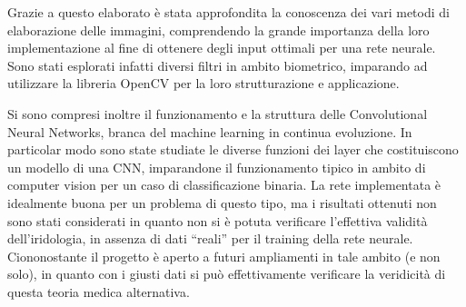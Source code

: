 Grazie a questo elaborato è stata approfondita la conoscenza dei vari metodi di elaborazione delle immagini, comprendendo la grande importanza della loro implementazione al fine di ottenere degli input ottimali per una rete neurale. Sono stati esplorati infatti diversi filtri in ambito biometrico, imparando ad utilizzare la libreria OpenCV per la loro strutturazione e applicazione.

Si sono compresi inoltre il funzionamento e la struttura delle Convolutional Neural Networks, branca del machine learning in continua evoluzione. In particolar modo sono state studiate le diverse funzioni dei layer che costituiscono un modello di una CNN, imparandone il funzionamento tipico in ambito di computer vision per un caso di classificazione binaria. La rete implementata è idealmente buona per un problema di questo tipo, ma i risultati ottenuti non sono stati considerati in quanto non si è potuta verificare l’effettiva validità dell’iridologia, in assenza di dati “reali” per il training della rete neurale. Ciononostante il progetto è aperto a futuri ampliamenti in tale ambito (e non solo), in quanto con i giusti dati si può effettivamente verificare la veridicità di questa teoria medica alternativa.
